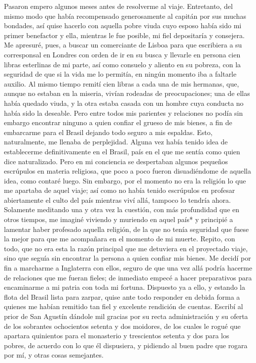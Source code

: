 \documentclass{novela}
\begin{document}
    Pasaron empero algunos meses antes de resolverme al viaje. Entretanto, del mismo modo que había recompensado generosamente al capitán por sus muchas bondades, así quise hacerlo con aquella pobre viuda cuyo esposo había sido mi primer benefactor y ella, mientras le fue posible, mi fiel depositaría y consejera. Me apresuré, pues, a buscar un comerciante de Lisboa para que escribiera a su corresponsal en Londres con orden de ir en su busca y llevarle en persona cien libras esterlinas de mi parte, así como consuelo y aliento en su pobreza, con la seguridad de que si la vida me lo permitía, en ningún momento iba a faltarle auxilio. Al mismo tiempo remití cien libras a cada una de mis hermanas, que, aunque no estaban en la miseria, vivían rodeadas de preocupaciones; una de ellas había quedado viuda, y la otra estaba casada con un hombre cuya conducta no había sido la deseable.
    Pero entre todos mis parientes y relaciones no podía sin embargo encontrar ninguno a quien confiar el grueso de mis bienes, a fin de embarcarme para el Brasil dejando todo seguro a mis espaldas. Esto, naturalmente, me llenaba de perplejidad.
    Alguna vez había tenido idea de establecerme definitivamente en el Brasil, país en el que me sentía como quien dice naturalizado. Pero en mi conciencia se despertaban algunos pequeños escrúpulos en materia religiosa, que poco a poco fueron disuadiéndome de aquella idea, como contaré luego. Sin embargo, por el momento no era la religión lo que me apartaba de aquel viaje; así como no había tenido escrúpulos en profesar  abiertamente el culto del país mientras viví allá, tampoco lo tendría ahora. Solamente meditando una y otra vez la cuestión, con más profundidad que en otros tiempos, me imaginé viviendo y muriendo en aquel país* y principié a lamentar haber profesado aquella religión, de la que no tenía seguridad que fuese la mejor para que me acompañara en el momento de mi muerte.
    Repito, con todo, que no era esta la razón principal que me detuviera en el proyectado viaje, sino que seguía sin encontrar la persona a quien confiar mis bienes. Me decidí por fin a marcharme a Inglaterra con ellos, seguro de que una vez allá podría hacerme de relaciones que me fueran fieles; de inmediato empecé a hacer preparativos para encaminarme a mi patria con toda mi fortuna.
    Dispuesto ya a ello, y estando la flota del Brasil lista para zarpar, quise ante todo responder en debida forma a quienes me habían remitido tan fiel y excelente rendición de cuentas. Escribí al prior de San Agustín dándole mil gracias por su recta administración y su oferta de los sobrantes ochocientos setenta y dos moidores, de los cuales le rogué que apartara quinientos para el monasterio y trescientos setenta y dos para los pobres, de acuerdo con lo que él dispusiera, y pidiendo al buen padre que rogara por mí, y otras cosas semejantes.
\end{document}
